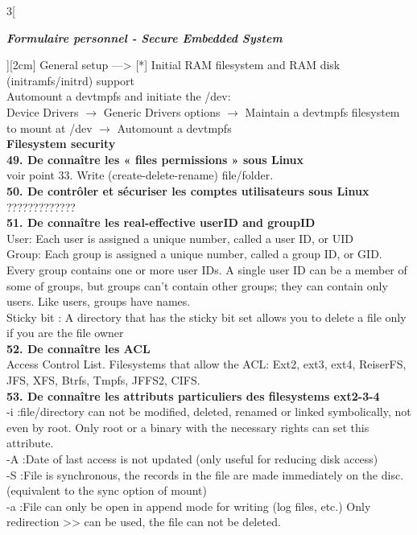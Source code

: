 \begin{multicols}{3}[\centerline{ \large\em \textbf{Formulaire personnel - Secure Embedded System}}][2cm]
General setup ---> [*] Initial RAM filesystem and RAM disk (initramfs/initrd) support\\
Automount a devtmpfs and initiate the /dev:\\
Device Drivers $\rightarrow$ Generic Drivers options $\rightarrow$ Maintain a devtmpfs filesystem to mount at /dev $\rightarrow$ Automount a devtmpfs\\
{\Large \textbf{Filesystem security}}
\\ \textbf{49. De connaître les « files permissions » sous Linux\\}
voir point 33. Write (create-delete-rename) file/folder.
\\ \textbf{50. De contrôler et sécuriser les comptes utilisateurs sous Linux\\}
?????????????\\ 
\textbf{51. De connaître les real-effective userID and groupID\\}
User: Each user is assigned a unique number, called a user ID, or UID\\
Group: Each group is assigned a unique number, called a group ID, or
GID. Every group contains one or more user IDs. A single user ID can be
a member of some of groups, but groups can’t contain other groups; they
can contain only users. Like users, groups have names.\\
Sticky bit : A directory that has the sticky bit set allows you to delete a file only if you are the file owner
\\ \textbf{52. De connaître les ACL\\}
Access Control List. Filesystems that allow the ACL: Ext2, ext3, ext4, ReiserFS, JFS, XFS, Btrfs, Tmpfs, JFFS2, CIFS. 
\\ \textbf{53. De connaître les attributs particuliers des filesystems ext2-3-4\\}
-i :file/directory can not be modified, deleted, renamed or linked
symbolically, not even by root. Only root or a binary with the necessary
rights can set this attribute.\\
-A :Date of last access is not updated (only useful for reducing disk
access)\\
-S :File is synchronous, the records in the file are made immediately on
the disc. (equivalent to the sync option of mount)\\
-a :File can only be open in append mode for writing (log files, etc.) Only
redirection >> can be used, the file can not be deleted.\\

\end{multicols}
